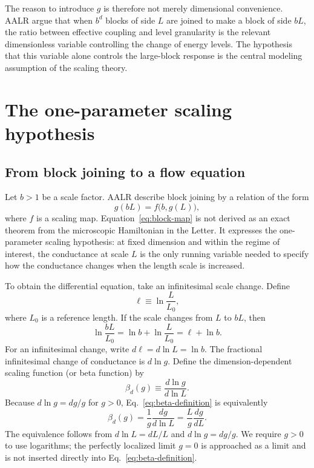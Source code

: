 \documentclass[11pt,a4paper]{article}
\numberwithin{equation}{section}
\begin{document}
The reason to introduce $g$ is therefore not merely dimensional convenience. AALR argue that when $b^d$ blocks of side $L$ are joined to make a block of side $bL$, the ratio between effective coupling and level granularity is the relevant dimensionless variable controlling the change of energy levels. The hypothesis that this variable alone controls the large-block response is the central modeling assumption of the scaling theory.

\section{The one-parameter scaling hypothesis}

\subsection{From block joining to a flow equation}

Let $b>1$ be a scale factor. AALR describe block joining by a relation of the form
\begin{equation}
    g(bL)=f\bigl(b,g(L)\bigr),
    \label{eq:block-map}
\end{equation}
where $f$ is a scaling map. Equation~\eqref{eq:block-map} is not derived as an exact theorem from the microscopic Hamiltonian in the Letter. It expresses the one-parameter scaling hypothesis: at fixed dimension and within the regime of interest, the conductance at scale $L$ is the only running variable needed to specify how the conductance changes when the length scale is increased.

To obtain the differential equation, take an infinitesimal scale change. Define
\begin{equation}
    \ell\equiv \ln\frac{L}{L_0},
    \label{eq:ell-definition}
\end{equation}
where $L_0$ is a reference length. If the scale changes from $L$ to $bL$, then
\begin{equation}
    \ln\frac{bL}{L_0}
    =\ln b+\ln\frac{L}{L_0}
    =\ell+\ln b.
\end{equation}
For an infinitesimal change, write $d\ell=d\ln L=\ln b$. The fractional infinitesimal change of conductance is $d\ln g$. Define the dimension-dependent scaling function (or beta function) by
\begin{equation}
    \beta_d(g)\equiv\frac{d\ln g}{d\ln L}.
    \label{eq:beta-definition}
\end{equation}
Because $d\ln g=dg/g$ for $g>0$, Eq.~\eqref{eq:beta-definition} is equivalently
\begin{equation}
    \beta_d(g)=\frac{1}{g}\frac{dg}{d\ln L}
               =\frac{L}{g}\frac{dg}{dL}.
    \label{eq:beta-equivalent}
\end{equation}
The equivalence follows from $d\ln L=dL/L$ and $d\ln g=dg/g$. We require $g>0$ to use logarithms; the perfectly localized limit $g=0$ is approached as a limit and is not inserted directly into Eq.~\eqref{eq:beta-definition}.
\end{document}
